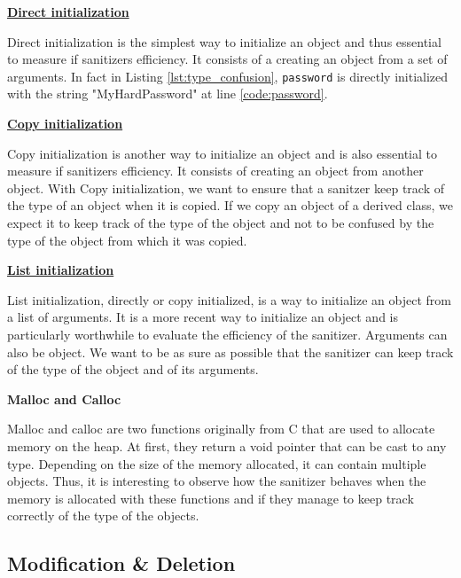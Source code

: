 \documentclass[a4paper,11pt,oneside]{report}
\begin{document}
\textbf{\href{https://en.cppreference.com/w/cpp/language/direct_initialization}{Direct initialization}}

\noindent{}Direct initialization is the simplest way to initialize an object and thus essential to measure if 
sanitizers efficiency. It consists of a creating an object from a set of arguments. 
In fact in Listing \autoref{lst:type_confusion}, \texttt{password} is directly initialized with the string "MyHardPassword"
at line \ref{code:password}. 

\textbf{\href{https://en.cppreference.com/w/cpp/language/copy_initialization}{Copy initialization}}

\noindent{}Copy initialization is another way to initialize an object and is also essential to measure if
sanitizers efficiency. It consists of creating an object from another object. With Copy initialization, we want to 
ensure that a sanitzer keep track of the type of an object when it is copied. If we copy an object of a derived class,
we expect it to keep track of the type of the object and not to be confused by the type of the object from which it was copied.

\textbf{\href{https://en.cppreference.com/w/cpp/language/list_initialization}{List initialization}}

\noindent{}List initialization, directly or copy initialized, is a way to initialize an object from a list of arguments.
It is a more recent way to initialize an object and is particularly worthwhile to evaluate the efficiency of the sanitizer.
Arguments can also be object. We want to be as sure as possible that the sanitizer can keep track of the type of the object
and of its arguments. 

\textbf{Malloc and Calloc}

\noindent{}Malloc and calloc are two functions originally from C that are used to allocate memory on the heap. At first, they
return a void pointer that can be cast to any type. Depending on the size of the memory allocated, it can contain multiple objects.
Thus, it is interesting to observe how the sanitizer behaves when the memory is allocated with these functions and if they manage
to keep track correctly of the type of the objects.

\subsection{Modification \& Deletion}
\end{document}
